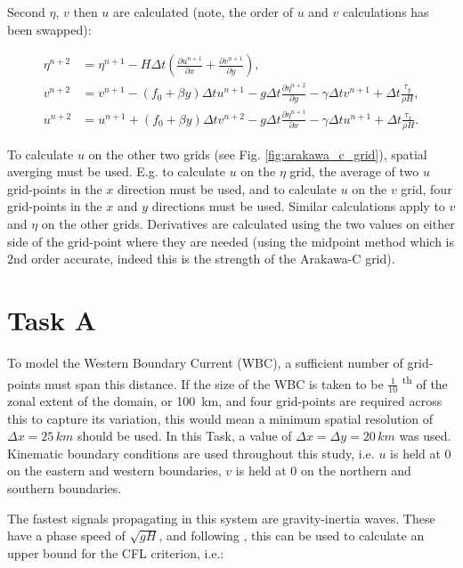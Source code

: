\documentclass{article}
\newcommand{\ts}{\textsuperscript}
\begin{document}
Second $\eta$, $v$ then $u$ are calculated (note, the order of $u$ and $v$ calculations has been
swapped):

\begin{align}
    \label{eqn:swe_arakawa4} 
    \eta^{n+2} & =  \eta^{n+1}- H \Delta t (\frac{\partial u^{n+1}}{\partial x} + \frac{\partial
    v^{n+1}}{\partial y} ),  \\
    \label{eqn:swe_arakawa5} 
    v^{n+2} & = v^{n+1} - (f_0 + \beta y) \Delta t u^{n+1} - g \Delta t \frac{\partial \eta^{n+2}}{\partial y} -
    \gamma \Delta t v^{n+1} + \Delta t \frac{\tau_y}{\rho H}, \\
    \label{eqn:swe_arakawa6} 
    u^{n+2} & = u^{n+1} + (f_0 + \beta y) \Delta t v^{n+2} - g \Delta t \frac{\partial
	\eta^{n+1}}{\partial x} - \gamma \Delta t u^{n+1} + \Delta t \frac{\tau_x}{\rho H}.
\end{align}

To calculate $u$ on the other two grids (see Fig. \ref{fig:arakawa_c_grid}), spatial averging must
be used. E.g. to calculate $u$ on the $\eta$ grid, the average of two $u$ grid-points in the $x$
direction must be used, and to calculate $u$ on the $v$ grid, four grid-points in the $x$ and $y$
directions must be used. Similar calculations apply to $v$ and $\eta$ on the other grids.
Derivatives are calculated using the two values on either side of the grid-point where they are
needed (using the midpoint method which is 2nd order accurate, indeed this is the strength of the
Arakawa-C grid).

\section*{Task A}

To model the Western Boundary Current (WBC), a sufficient number of grid-points must span this
distance. If the size of the WBC is taken to be $\frac{1}{10}$ \ts{th} of the zonal extent of the
domain, or \SI{100}{km}, and four grid-points are required across this to capture its variation,
this would mean a minimum spatial resolution of $\Delta x = 25\, km$ should be used. In this Task, a
value of $\Delta x = \Delta y = 20\, km$ was used. Kinematic boundary conditions are used throughout
this study, i.e. $u$ is held at $0$ on the eastern and western boundaries, $v$ is held at $0$ on the
northern and southern boundaries.

The fastest signals propagating in this system are gravity-inertia waves. These have a phase speed
of $\sqrt{g H}$, and following \textcite{beckers1993stability}, this can be used to calculate an
upper bound for the CFL criterion, i.e.:
\end{document}
